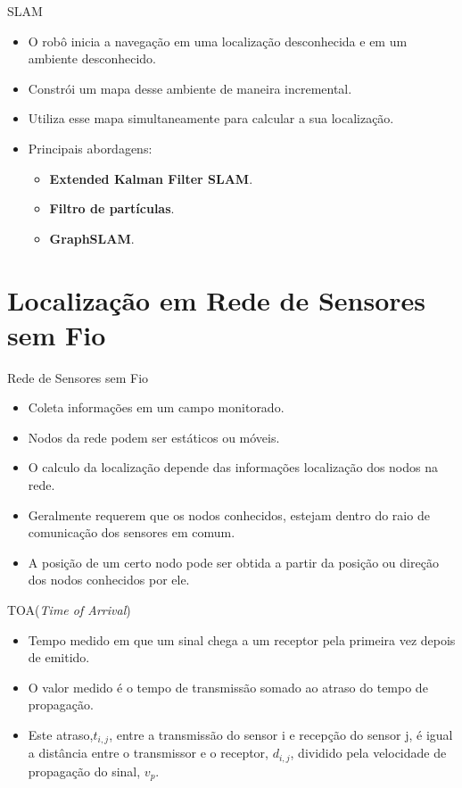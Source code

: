 \documentclass{beamer}
\newlength{\wideitemsep}
\let\olditem\item
\renewcommand{\item}{\setlength{\itemsep}{\wideitemsep}\olditem}
\begin{document}
\begin{frame}{SLAM}
\begin{itemize}
  \item O robô inicia a navegação em uma localização desconhecida e em um ambiente desconhecido.
  \item Constrói um mapa desse ambiente de maneira incremental.
  \item Utiliza esse mapa simultaneamente para calcular a sua localização.
  \item Principais abordagens:
  \begin{itemize}
  \item \textbf{Extended Kalman Filter SLAM}. 
  \item \textbf{Filtro de partículas}.
  \item \textbf{GraphSLAM}.
  \end{itemize}
\end{itemize}
\end{frame}

\section{Localização em Rede de Sensores sem Fio} %

\begin{frame}{Rede de Sensores sem Fio}
\begin{itemize}
 \item Coleta informações em um campo monitorado.
 \item Nodos da rede podem ser estáticos ou móveis.
 \item O calculo da localização depende das informações localização dos nodos na rede.
 \item Geralmente requerem que os nodos conhecidos, estejam dentro 
	do raio de comunicação dos sensores em comum.
  \item A posição de um certo nodo pode ser obtida 
  a partir da posição ou direção dos nodos conhecidos por ele.
\end{itemize}
\end{frame}

\begin{frame}{TOA(\textit{Time of Arrival})}

\begin{itemize}
 \item Tempo medido em que um sinal chega a um
receptor pela primeira vez depois de emitido.
\item O valor medido é o tempo de transmissão somado ao
atraso do tempo de propagação.
\item Este atraso,$t_{i,j}$, entre a transmissão do sensor i e recepção do sensor j, é igual a distância entre o transmissor e o receptor, 
$d_{i,j}$, dividido pela velocidade de propagação do sinal, $v_{p}$.

\end{itemize}
\end{frame}
\end{document}
